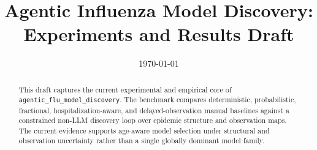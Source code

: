 \documentclass[11pt]{article}
\title{Agentic Influenza Model Discovery:\\Experiments and Results Draft}
\author{}
\date{\today}
\begin{document}
\maketitle

\begin{abstract}
This draft captures the current experimental and empirical core of
\texttt{agentic\_flu\_model\_discovery}. The benchmark compares deterministic,
probabilistic, fractional, hospitalization-aware, and delayed-observation
manual baselines against a constrained non-LLM discovery loop over epidemic
structure and observation maps. The current evidence supports age-aware model
selection under structural and observation uncertainty rather than a single
globally dominant model family.
\end{abstract}

\tableofcontents





\end{document}
